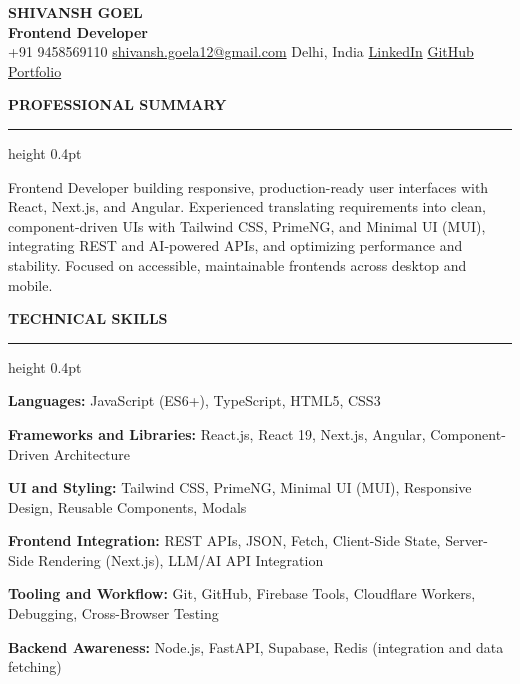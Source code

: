 \documentclass[10pt,a4paper]{article}
\newcommand{\resumeSection}[1]{%
  \vspace{5pt}
  {\normalsize\bfseries\color{heading} #1}\par
  \vspace{1pt}
  {\color{rulecolor}\hrule height 0.4pt}
  \vspace{3pt}
}
\newcommand{\skillLine}[2]{%
  \textbf{#1:} #2\par
}
\begin{document}
\begin{center}
    {\fontsize{21}{23}\selectfont\bfseries\color{heading}
    SHIVANSH GOEL}\\[2pt]
    {\normalsize\bfseries Frontend Developer}\\[4pt]

    {\small
    +91 9458569110
    \quad \textbar{} \quad
    \href{mailto:shivansh.goela12@gmail.com}
    {shivansh.goela12@gmail.com}
    \quad \textbar{} \quad
    Delhi, India
    \quad \textbar{} \quad
    \href{https://www.linkedin.com/in/shivansh-goel-5b2309174}
    {LinkedIn}
    \quad \textbar{} \quad
    \href{https://github.com/Tech-aficionado}
    {GitHub}
    \quad \textbar{} \quad
    \href{https://0xshiv.dev}
    {Portfolio}
    }
\end{center}

\vspace{-4pt}

\resumeSection{PROFESSIONAL SUMMARY}

Frontend Developer building responsive, production-ready user interfaces with
React, Next.js, and Angular. Experienced translating requirements into clean,
component-driven UIs with Tailwind CSS, PrimeNG, and Minimal UI (MUI),
integrating REST and AI-powered APIs, and optimizing performance and
stability. Focused on accessible, maintainable frontends across desktop and
mobile.

\resumeSection{TECHNICAL SKILLS}

\small

\skillLine{Languages}
{JavaScript (ES6+), TypeScript, HTML5, CSS3}

\skillLine{Frameworks and Libraries}
{React.js, React 19, Next.js, Angular, Component-Driven Architecture}

\skillLine{UI and Styling}
{Tailwind CSS, PrimeNG, Minimal UI (MUI), Responsive Design,
Reusable Components, Modals}

\skillLine{Frontend Integration}
{REST APIs, JSON, Fetch, Client-Side State, Server-Side Rendering (Next.js),
LLM/AI API Integration}

\skillLine{Tooling and Workflow}
{Git, GitHub, Firebase Tools, Cloudflare Workers, Debugging, Cross-Browser
Testing}

\skillLine{Backend Awareness}
{Node.js, FastAPI, Supabase, Redis (integration and data fetching)}
\end{document}

